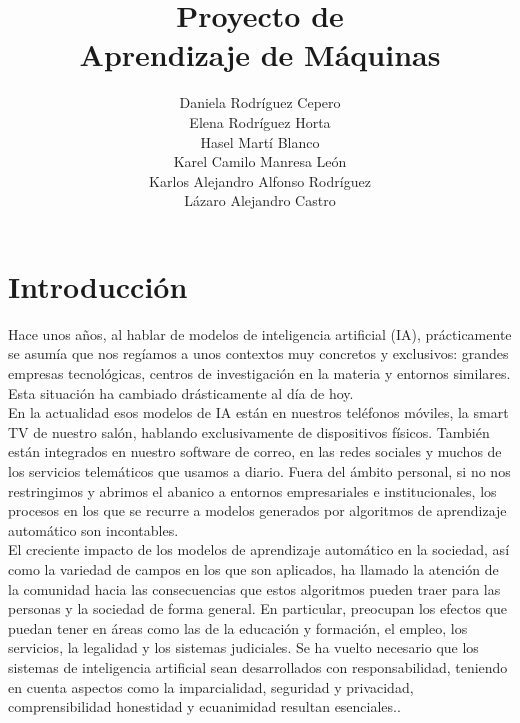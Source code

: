 \documentclass[runningheads,a4paper]{llncs}
\begin{document}
	
	\title{Proyecto de \\Aprendizaje de M\'aquinas}
	
	
	
	\author{ Daniela Rodr\'iguez Cepero\\ Elena Rodr\'iguez Horta\\ Hasel Mart\'i Blanco\\ Karel Camilo Manresa Le\'on\\ Karlos Alejandro Alfonso Rodr\'iguez\\ L\'azaro Alejandro Castro }
	
	
	
	
	\maketitle
	
	\newpage
	\tableofcontents
	
	
\newpage	
\section{Introducci\'on}
Hace unos a\~nos, al hablar de modelos de inteligencia artificial (IA), pr\'acticamente se asum\'ia que nos reg\'iamos a unos contextos muy concretos y exclusivos: grandes empresas tecnol\'ogicas, centros de investigaci\'on en la materia y entornos similares. Esta situaci\'on ha cambiado dr\'asticamente al d\'ia de hoy.\\

En la actualidad esos modelos de IA est\'an en nuestros tel\'efonos m\'oviles, la smart TV de nuestro sal\'on, hablando exclusivamente de dispositivos f\'isicos. Tambi\'en est\'an integrados en nuestro software de correo, en las redes sociales y muchos de los servicios telem\'aticos que usamos a diario. Fuera del \'ambito personal, si no nos restringimos y abrimos el abanico a entornos empresariales e institucionales, los procesos en los que se recurre a 
modelos generados por algoritmos de aprendizaje autom\'atico son incontables.\\

El creciente impacto de los modelos de aprendizaje autom\'atico en la sociedad, as\'i
como la variedad de campos en los que son aplicados, ha llamado la atenci\'on de la comunidad hacia las consecuencias que estos algoritmos pueden traer para las personas
y la sociedad de forma general. En particular, preocupan los efectos que puedan tener
en \'areas como las de la educaci\'on y formaci\'on, el empleo, los servicios, la legalidad
y los sistemas judiciales. Se ha vuelto necesario que los sistemas de inteligencia
artificial sean desarrollados con responsabilidad, teniendo en cuenta aspectos como la
imparcialidad, seguridad y privacidad, comprensibilidad honestidad y ecuanimidad resultan esenciales.\cite{Toma}.\\
\end{document}
